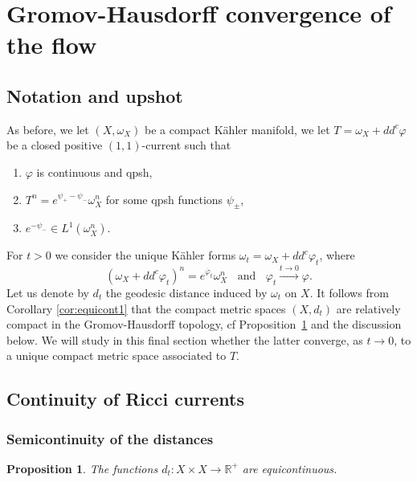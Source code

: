 \documentclass[a4paper,11pt,leqno,english]{smfart}
\theoremstyle{plain}
\theoremstyle{plain}
\numberwithin{equation}{section} %
\numberwithin{figure}{section} %
\theoremstyle{plain}
\newtheorem{prop}[thm]{Proposition} %
\theoremstyle{plain}
\theoremstyle{remark}
\theoremstyle{remark}
\theoremstyle{definition}
\theoremstyle{plain}
\theoremstyle{plain}
\theoremstyle{definition}
\newcommand{\R}{{\mathbb{R}}}
\newcommand{\f}{\varphi}
\newcommand{\p}{\psi}
\begin{document}
 




 
 \section{Gromov-Hausdorff convergence of the flow} \label{sec:GH}
 
 
 \subsection{Notation and upshot}
 \label{sec GH KRF}
 
As before, we let $(X, \omega_X)$ be a compact Kähler manifold, we let $T=\omega_X+dd^c \f$ be a closed positive $(1,1)$-current such that 
\begin{enumerate}[label=$\bullet$]
\item $\f$ is continuous and qpsh,
\item $T^n=e^{\p_+-\p_-} \omega_X^n$ for some qpsh functions $\p_{\pm}$,
\item $e^{-\p_-} \in L^1(\omega_X^n)$.
\end{enumerate}
For $t>0$ we consider the unique K\"ahler forms 
$\omega_t=\omega_X+dd^c \f_t$, where 
$$
(\omega_X+dd^c \f_t)^n=e^{\dot{\f_t}} \omega_X^n
\; \; \text{ and } \; \;
\f_t \stackrel{t \rightarrow 0}{\longrightarrow} \f.
$$
Let us denote by $d_t$ the geodesic distance induced by $\omega_t$ on $X$. It follows from Corollary \ref{cor:equicont1}  that the  compact metric spaces  
 $(X,d_{t})$ are relatively compact in the Gromov-Hausdorff topology, cf Proposition~\ref{pro:equicont} and the discussion below.
 We will study in this final section whether the latter  converge, as $t \rightarrow 0$,
 to a unique  compact metric space associated to $T$.
 
  



\subsection{Continuity of Ricci currents}


\subsubsection{Semicontinuity of the distances}
 




\begin{prop} \label{pro:equicont}
The functions $d_t: X \times X \rightarrow \R^+$ are equicontinuous.
\end{prop}
\end{document}
